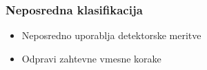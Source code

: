 \documentclass[14pt, t]{beamer}
\begin{document}
\begin{frame}
\frametitle{Neposredna klasifikacija}

    \begin{itemize}
    
        \item<1-> Neposredno uporablja detektorske meritve

        \item<2-> Odpravi zahtevne vmesne korake

    \end{itemize}

    

\end{frame}




\end{document}
